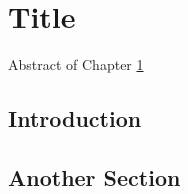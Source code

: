 \chapter{Title}\label{CHAP2}

\noindent Abstract of Chapter \ref{CHAP2}

\section{Introduction}\label{CHAP2_1}

\lipsum

\section{Another Section}\label{CHAP23_2}

\lipsum